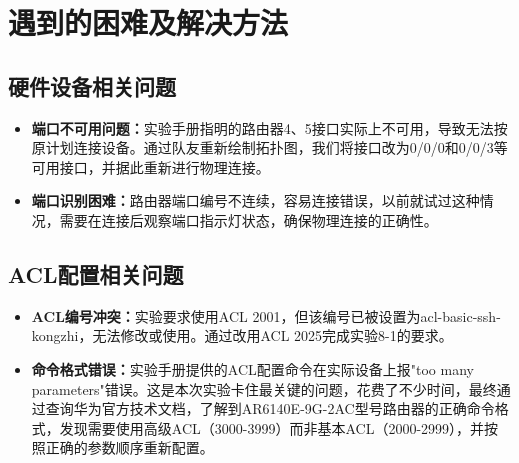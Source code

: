 \documentclass[a4paper]{article}
\begin{document}
\section{遇到的困难及解决方法}

\subsection{硬件设备相关问题}
\begin{itemize}
    \item \textbf{端口不可用问题：}实验手册指明的路由器4、5接口实际上不可用，导致无法按原计划连接设备。通过队友重新绘制拓扑图，我们将接口改为0/0/0和0/0/3等可用接口，并据此重新进行物理连接。
    \item \textbf{端口识别困难：}路由器端口编号不连续，容易连接错误，以前就试过这种情况，需要在连接后观察端口指示灯状态，确保物理连接的正确性。
\end{itemize}

\subsection{ACL配置相关问题}
\begin{itemize}
    \item \textbf{ACL编号冲突：}实验要求使用ACL 2001，但该编号已被设置为acl-basic-ssh-kongzhi，无法修改或使用。通过改用ACL 2025完成实验8-1的要求。
    \item \textbf{命令格式错误：}实验手册提供的ACL配置命令在实际设备上报"too many parameters"错误。这是本次实验卡住最关键的问题，花费了不少时间，最终通过查询华为官方技术文档，了解到AR6140E-9G-2AC型号路由器的正确命令格式，发现需要使用高级ACL（3000-3999）而非基本ACL（2000-2999），并按照正确的参数顺序重新配置。
\end{itemize}
\end{document}
